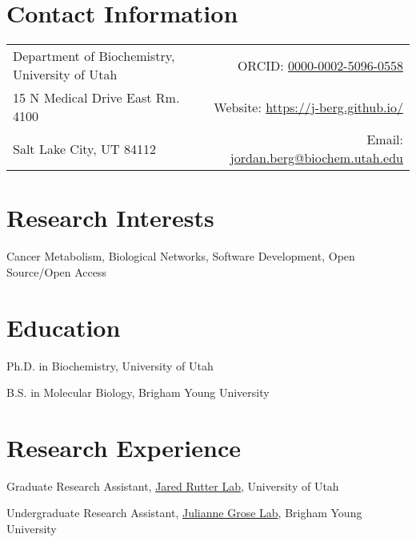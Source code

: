 \documentclass[margin,line]{res}
\begin{document}

\begin{resume}
\section{\sc Contact Information}
\vspace{.05in}
\hspace{-0.1in}
\begin{tabular}{lr}
Department of Biochemistry, University of Utah
  & \hspace{1.05in} \hfill
    ORCID: \href{https://orcid.org/0000-0002-5096-0558}{0000-0002-5096-0558}  \\
15 N Medical Drive East Rm. 4100
  & \hfill
    Website: \href{https://j-berg.github.io/}{https://j-berg.github.io/} \\
Salt Lake City, UT 84112
  & \hfill
    Email: \href{mailto:jordan.berg@biochem.utah.edu}{jordan.berg@biochem.utah.edu} \\

\end{tabular}


\section{\sc Research Interests}
Cancer Metabolism, Biological Networks, Software Development, Open Source/Open Access


\section{\sc Education}
\begin{description}[style=multiline, leftmargin=2.2cm, font=\normalfont]
\item[2016-present] Ph.D. in Biochemistry, University of Utah
\item[2010-2016] B.S. in Molecular Biology, Brigham Young University
\end{description}


\section{\sc Research Experience}
\begin{description}[style=multiline, leftmargin=2.2cm, font=\normalfont]
\item[2016-present] Graduate Research Assistant, \href{http://rutter.biochem.utah.edu/}{Jared Rutter Lab}, University of Utah
\item[2013-2016] Undergraduate Research Assistant, \href{https://mmbio.byu.edu/grose-lab}{Julianne Grose Lab}, Brigham Young University
\end{description}



\end{resume}
\end{document}
